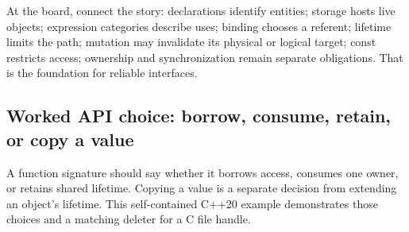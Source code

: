 At the board, connect the story: declarations identify entities; storage hosts live objects; expression categories describe uses; binding chooses a referent; lifetime limits the path; mutation may invalidate its physical or logical target; const restricts access; ownership and synchronization remain separate obligations. That is the foundation for reliable interfaces.

\subsection{Worked API choice: borrow, consume, retain, or copy a value}\label{05-engine-i-ch003-worked-api-choice-borrow-consume-retain-or-copy-a-value}

\hypertarget{05-engine-i-ch003-worked-api-choice-borrow-consume-retain-or-copy-a-value}{}

A function signature should say whether it borrows access, consumes one owner, or retains shared lifetime. Copying a value is a separate decision from extending an object's lifetime. This self-contained C++20 example demonstrates those choices and a matching deleter for a C file handle.

